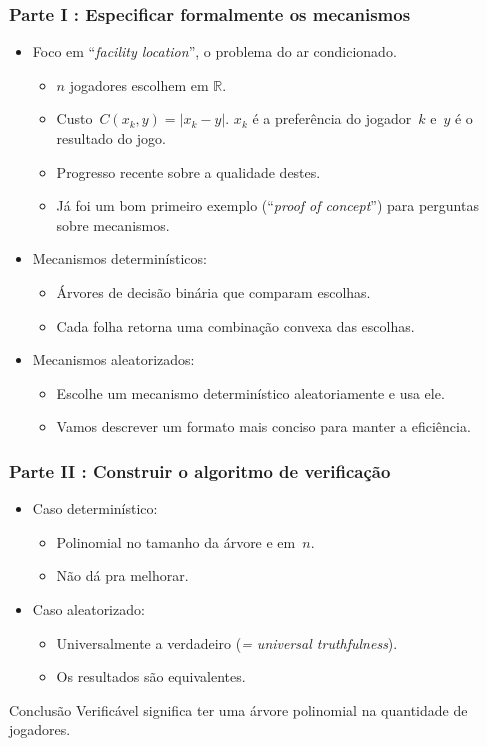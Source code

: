 \documentclass[usenames,dvipsnames]{beamer}
\begin{document}
\begin{frame}
\frametitle{Parte I : Especificar formalmente os mecanismos}
\begin{itemize}
\item Foco em ``\textit{facility location}'', o problema do ar condicionado.
\begin{itemize}
    \item $n$ jogadores escolhem em $\mathbb{R}$.
    \item Custo~$C(x_k,y) = |x_k-y|$. $x_k$ é a preferência do jogador~$k$ e~$y$ é o resultado do jogo.
    \item Progresso recente sobre a qualidade destes.
    \item Já foi um bom primeiro exemplo (``\textit{proof of concept}'') para perguntas sobre mecanismos.
\end{itemize}
\pause
\item Mecanismos determinísticos:
\begin{itemize}
    \item Árvores de decisão binária que comparam escolhas.
    \item Cada folha retorna uma combinação convexa das escolhas.
\end{itemize}
\item Mecanismos aleatorizados:
\begin{itemize}
    \item Escolhe um mecanismo determinístico aleatoriamente e usa ele.
    \item Vamos descrever um formato mais conciso para manter a eficiência.
\end{itemize}
\end{itemize}
\end{frame}

\begin{frame}
\frametitle{Parte II : Construir o algoritmo de verificação}
\begin{itemize}
\item Caso determinístico:
\begin{itemize}
\item Polinomial no tamanho da árvore e em~$n$.
\item Não dá pra melhorar.
\end{itemize}
\item Caso aleatorizado:
\begin{itemize}
    \item Universalmente a verdadeiro (\textit{= universal truthfulness}).
    \item Os resultados são equivalentes.
\end{itemize}
\end{itemize}

\begin{block}{Conclusão}
 Verificável significa ter uma árvore polinomial na quantidade de jogadores.
\end{block}
\end{frame}
\end{document}
